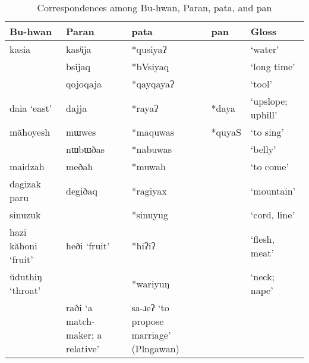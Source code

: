\begin{longtable}[c]{>{\raggedright}p{2.7cm}>{\raggedright}p{2.7cm}>{\raggedright}p{2.7cm}ll}
\caption{Correspondences among Bu-hwan, Paran, \acl{pata}, and \acl{pan}}
\label{tab:bhandprz}\\
\hline
Bu-hwan                  & Paran                            & \ac{pata}                                     & \ac{pan} & Gloss             \\  \hline
kasia                    & kasʲija                          & *qusiyaʔ                                      &          & `water'           \\
                         & bsijaq                           & *bVsiyaq                                      &          & `long time'       \\
                         & qojoqaja                         & *qayqayaʔ                                     &          & `tool'            \\
daia `east'              & dajja                            & *rayaʔ                                        & *daya    & `upslope; uphill' \\ 
măhoyesh                 & mɯwes                            & *maquwas                                      & *quyaS   & `to sing'         \\ \hdashline
                         & nɯbɯðas                          & *nabuwas                                      &          & `belly'           \\
maidzah                  & meðaħ                            & *muwah                                        &          & `to come'         \\
dagizak paru             & degiðaq                          & *ragiyax                                      &          & `mountain'        \\
sinuzuk                  &                                  & *sinuyug                                      &          & `cord, line'      \\
hazi kăhoni `fruit'      & heði `fruit'                     & *hiʔiʔ                                        &          & `flesh, meat'     \\
ŭduthiŋ `throat'        &                                  & *wariyuŋ                                      &          & `neck; nape'      \\
                         & raði `a match-maker; a relative' & sa-ɹeʔ `to propose marriage' (Plngawan)       &          &                   \\

\end{longtable}
